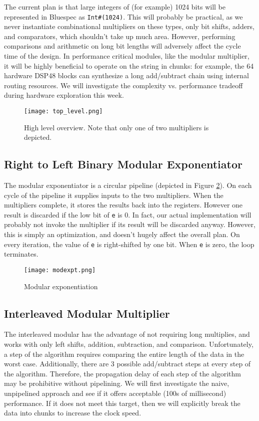 \documentclass[12pt]{article}
\begin{document}
The current plan is that large integers of (for example) 1024 bits
will be represented in Bluespec as {\tt Int\#(1024)}.
This will probably be practical, as we never instantiate combinational multipliers on these types,
only bit shifts, adders, and comparators, which shouldn't take up much area. However, performing
comparisons and arithmetic on long bit lengths will adversely affect the cycle time of the design.
In performance critical modules, like the modular multiplier, it will be highly beneficial
to operate on the string in chunks: for example, the 64 hardware DSP48 blocks can synthesize
a long add/subtract chain using internal routing resources. We will investigate the complexity vs. performance
tradeoff during hardware exploration this week.

\begin{figure}
  \begin{centering}
    \texttt{[image: top\_level.png]}
    \caption{High level overview. Note that only one of two multipliers is depicted.}
    \label{fig-top}
  \end{centering}
\end{figure}

\subsection{Right to Left Binary Modular Exponentiator}
The modular exponentiator is a circular pipeline (depicted in Figure \ref{fig-expt}).
On each cycle of the pipeline it supplies inputs to the two multipliers.
When the multipliers complete, it stores the results back into the registers.
However one result is discarded if the low bit of {\tt e} is 0.
In fact, our actual implementation will probably not invoke the multiplier
if its result will be discarded anyway.
However, this is simply an optimization, and doesn't hugely affect the overall plan.
On every iteration, the value of {\tt e} is right-shifted by one bit.
When {\tt e} is zero, the loop terminates.

\begin{figure}
  \begin{centering}
    \texttt{[image: modexpt.png]}
    \caption{Modular exponentiation}
    \label{fig-expt}
  \end{centering}
\end{figure}

\subsection{Interleaved Modular Multiplier}
The interleaved modular has the advantage of not requiring long multiplies, and works with
only left shifts, addition, subtraction, and comparison. Unfortunately, a step of the 
algorithm requires comparing the entire length of the data in the worst case. Additionally,
there are 3 possible add/subtract steps at every step of the algorithm. Therefore, the propagation delay
of each step of the algorithm may be prohibitive without pipelining. We will first investigate the
naive, unpipelined approach and see if it offers acceptable (100s of millisecond) performance. If it 
does not meet this target, then we will explicitly break the data into chunks to increase
the clock speed. 
\end{document}

